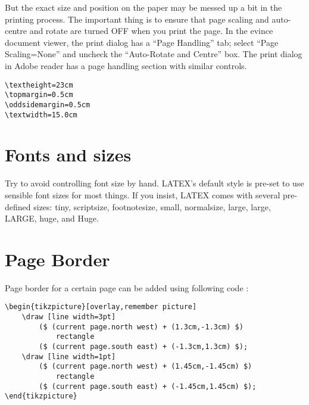 But the exact size and position on the paper may be messed up a bit in the printing process. The important thing is to ensure that page scaling and auto-centre and rotate are turned OFF when you print the page. In the evince document viewer, the print dialog has a “Page Handling” tab; select “Page Scaling=None” and uncheck the “Auto-Rotate and Centre” box. The print dialog in Adobe reader has a page handling section with similar controls. 

\begin{lstlisting}
\textheight=23cm 
\topmargin=0.5cm 
\oddsidemargin=0.5cm 
\textwidth=15.0cm 
\end{lstlisting}

\section{Fonts and sizes}

Try to avoid controlling font size by hand. LATEX’s default style is pre-set to use sensible font sizes for most things. If you insist, LATEX comes with several pre-defined sizes: {\tiny tiny}, {\scriptsize scriptsize}, {\footnotesize footnotesize}, {\small small}, {\normalsize normalsize}, {\large large}, {\large large}, {\LARGE LARGE}, {\huge huge}, and {\Huge Huge}.

\section{Page Border}

Page border for a certain page can be added using following code :

\noindent\verb|\begin{tikzpicture}[overlay,remember picture]|\\
\verb|    \draw [line width=3pt]|\\
\verb|        ($ (current page.north west) + (1.3cm,-1.3cm) $)|\\
\verb|            rectangle|\\
\verb|        ($ (current page.south east) + (-1.3cm,1.3cm) $);|\\
\verb|    \draw [line width=1pt]|\\
\verb|        ($ (current page.north west) + (1.45cm,-1.45cm) $)|\\
\verb|            rectangle|\\
\verb|        ($ (current page.south east) + (-1.45cm,1.45cm) $); |\\
\verb|\end{tikzpicture}|\\

